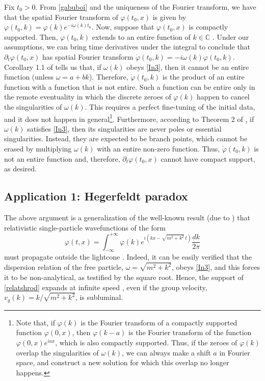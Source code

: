 \documentclass[prl, amsfonts, amssymb, amsmath, nofootinbib,reprint, showkeys, twoside,notitlepage]{revtex4-2}
\theoremstyle{definition}
\theoremstyle{theorem}
\theoremstyle{corollary}
\begin{document}
Fix $t_0 >0$. From \eqref{gabuboi} and the uniqueness of the Fourier transform, we have that the spatial Fourier
transform of $\varphi(t_0,x)$
is given by  $\varphi(t_0,k) = \varphi(k) e^{-i\omega(k) t_0}$. Now, suppose that $\varphi(t_0,x)$ is compactly supported. Then, $\varphi(t_0,k)$ extends to an entire function of $k\in \mathbb{C}$ \cite{Hormander_book}. 
Under our assumptions, we can bring time derivatives under the integral to conclude that $\partial_t\varphi(t_0,x)$ has spatial Fourier transform $\dot{\varphi}(t_0,k)=-i\omega(k)\varphi(t_0,k)$. Corollary 1.1 of \cite{HellerBounds2022} tells us that, if $\omega(k)$ obeys \eqref{In3}, then it cannot be an entire function (unless $\omega {=} a{+}bk$). Therefore, $\dot{\varphi}(t_0,k)$ is the product of an entire function with a function that is not entire. Such a function can be entire only in the remote eventuality in which the discrete zeroes of $\varphi(k)$ happen to cancel the singularities of $\omega(k)$. 
This requires a perfect fine-tuning of the initial data, and it does not happen in general\footnote{Note that, if $\varphi(k)$ is the Fourier transform of a compactly supported function $\varphi(0,x)$, then $\varphi(k-a)$ is the Fourier transform of the function $\varphi(0,x)e^{iax}$, which is also compactly supported. Thus, if the zeroes of $\varphi(k)$ overlap the singularities of $\omega(k)$, we can always make a shift $a$ in Fourier space, and construct a new solution for which this overlap no longer happens.}. Furthermore, according to Theorem 2 of \cite{HellerBounds2022}, if $\omega(k)$ satisfies \eqref{In3}, then its singularities are never poles or essential singularities. Instead, they are expected to be branch points, which cannot be erased by multiplying $\omega(k)$ with an entire non-zero function.  Thus, $\dot{\varphi}(t_0,k)$ is not an entire function and, therefore, $\partial_t \varphi(t_0,x)$ cannot have compact support, as desired.


\subsection{Application 1: Hegerfeldt paradox} The above argument is a generalization of the well-known result (due to \citet{Hegerfeldt1974}) that relativistic single-particle wavefunctions of the form 
\begin{equation}\label{relatshrod}
\varphi(t,x)= \int_{-\infty}^{+\infty} \varphi(k) e^{i(kx-\sqrt{m^2{+}k^2} \,t)} \dfrac{dk}{2\pi} 
\end{equation} 
must propagate outside the lightcone \cite{Peskin_book}. Indeed, it can be easily verified that the dispersion relation of the free particle, $\omega=\sqrt{m^2{+}k^2}$, obeys \eqref{In3}, and this forces it to be non-analytical, as testified by the square root. Hence, the support of \eqref{relatshrod} expands at infinite speed \cite{Thaller1992}, even if the group velocity, $v_g(k)=k/\sqrt{m^2{+}k^2}$, is subluminal.
\end{document}

